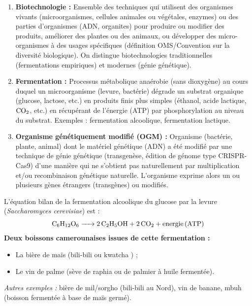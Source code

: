 \documentclass[11pt]{article}
\begin{document}
\begin{corrige}
\begin{enumerate}
\item \textbf{Biotechnologie :} Ensemble des techniques qui utilisent des organismes vivants (microorganismes, cellules animales ou végétales, enzymes) ou des parties d'organismes (ADN, organites) pour produire ou modifier des produits, améliorer des plantes ou des animaux, ou développer des micro-organismes à des usages spécifiques (définition OMS/Convention sur la diversité biologique). On distingue biotechnologies traditionnelles (fermentations empiriques) et modernes (génie génétique).
\item \textbf{Fermentation :} Processus métabolique anaérobie (sans dioxygène) au cours duquel un microorganisme (levure, bactérie) dégrade un substrat organique (glucose, lactose, etc.) en produits finis plus simples (éthanol, acide lactique, $\ce{CO2}$, etc.) en récupérant de l'énergie (ATP) par phosphorylation au niveau du substrat. Exemples : fermentation alcoolique, fermentation lactique.
\item \textbf{Organisme génétiquement modifié (OGM) :} Organisme (bactérie, plante, animal) dont le matériel génétique (ADN) a été modifié par une technique de génie génétique (transgenèse, édition de génome type CRISPR-Cas9) d'une manière qui ne s'obtient pas naturellement par multiplication et/ou recombinaison génétique naturelle. L'organisme exprime alors un ou plusieurs gènes étrangers (transgènes) ou modifiés.
\end{enumerate}
\end{corrige}

\begin{corrige}
L'équation bilan de la fermentation alcoolique du glucose par la levure (\emph{Saccharomyces cerevisiae}) est :
\[ \ce{C6H12O6 -> 2 C2H5OH + 2 CO2 + energie (ATP)} \]
\textbf{Deux boissons camerounaises issues de cette fermentation :}
\begin{itemize}
\item La bière de maïs (\og bili-bili \fg{} ou \og kwatcha \fg{}) ;
\item Le vin de palme (sève de raphia ou de palmier à huile fermentée).
\end{itemize}
\emph{Autres exemples :} bière de mil/sorgho (\og bili-bili \fg{} au Nord), vin de banane, \og mbuh \fg{} (boisson fermentée à base de maïs germé).
\end{corrige}
\end{document}
